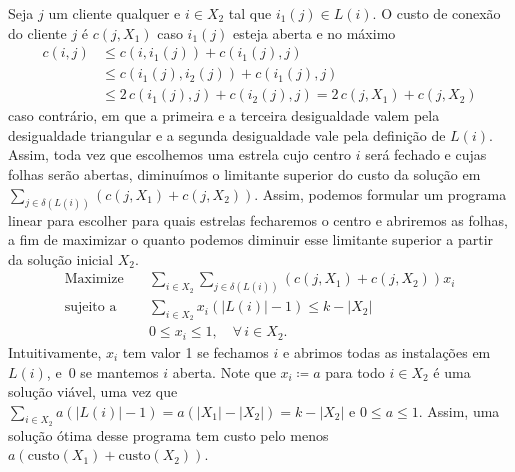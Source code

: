 Seja $j$ um cliente qualquer e $i \in X_2$ tal que $i_1(j) \in L(i)$. O custo de conexão do cliente $j$ é $c(j,X_1)$ caso $i_1(j)$ esteja aberta e no máximo 
\begin{align}
    c(i,j) &\leq c(i,i_1(j)) + c(i_1(j),j) \nonumber \\
    &\leq c(i_1(j),i_2(j)) +  c(i_1(j),j) \nonumber \\
    &\leq 2\,c(i_1(j),j) + c(i_2(j),j) = 2\,c(j,X_1) + c(j,X_2)\nonumber
\end{align}
caso contrário, em que a primeira e a terceira desigualdade valem pela desigualdade triangular e a segunda desigualdade vale pela definição de $L(i)$. Assim, toda vez que escolhemos uma estrela cujo centro $i$ será fechado e cujas folhas serão abertas, diminuímos o limitante superior do custo da solução em $\sum_{j \in \delta(L(i))}(c(j,X_1) + c(j,X_2))$. Assim, podemos formular um programa linear para escolher para quais estrelas fecharemos o centro e abriremos as folhas, a fim de maximizar o quanto podemos diminuir esse limitante superior a partir da solução inicial $X_2$.
\begin{align}
\text{Maximize} \quad &\sum_{i \in X_2} \sum_{j\in \delta(L(i))} (c(j,X_1) + c(j,X_2))x_i \nonumber\\
\text{sujeito a}\quad & \sum_{i \in X_2} x_i(|L(i)| - 1) \leq k - |X_2| \nonumber \\
&0 \leq x_i \leq 1, \quad \forall\, i \in X_2 \nonumber.
\end{align}
Intuitivamente, $x_i$ tem valor 1 se fechamos $i$ e abrimos todas as instalações em $L(i)$, e~0 se mantemos $i$ aberta. Note que $x_i \coloneqq a$ para todo $i \in X_2$ é uma solução viável, uma vez que $\sum_{i \in X_2} a(|L(i)| - 1) = a(|X_1| - |X_2|) = k - |X_2|$ e $ 0 \leq a \leq 1$. Assim, uma solução ótima desse programa tem custo pelo menos $a(\text{custo}(X_1) + \text{custo}(X_2))$.

